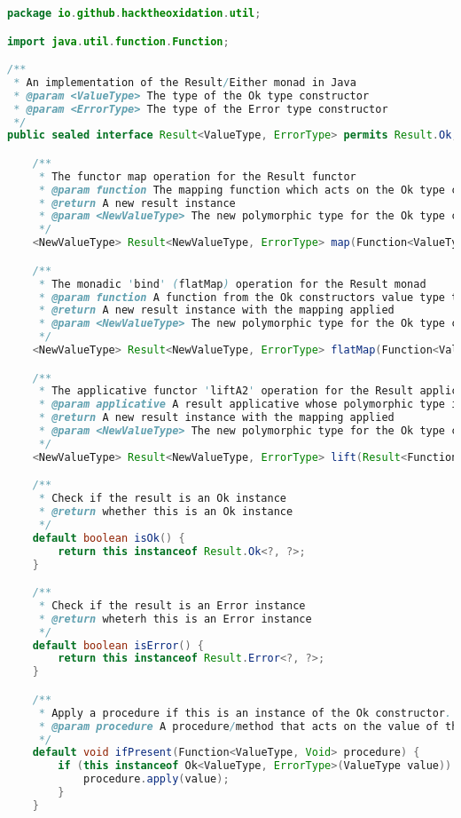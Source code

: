 \begin{lstlisting}[language=Java]
package io.github.hacktheoxidation.util;

import java.util.function.Function;

/**
 * An implementation of the Result/Either monad in Java
 * @param <ValueType> The type of the Ok type constructor
 * @param <ErrorType> The type of the Error type constructor
 */
public sealed interface Result<ValueType, ErrorType> permits Result.Ok, Result.Error {

    /**
     * The functor map operation for the Result functor
     * @param function The mapping function which acts on the Ok type constructor
     * @return A new result instance
     * @param <NewValueType> The new polymorphic type for the Ok type constructor
     */
    <NewValueType> Result<NewValueType, ErrorType> map(Function<ValueType, NewValueType> function);

    /**
     * The monadic 'bind' (flatMap) operation for the Result monad
     * @param function A function from the Ok constructors value type to a new Result
     * @return A new result instance with the mapping applied
     * @param <NewValueType> The new polymorphic type for the Ok type constructor
     */
    <NewValueType> Result<NewValueType, ErrorType> flatMap(Function<ValueType, Result<NewValueType, ErrorType>> function);

    /**
     * The applicative functor 'liftA2' operation for the Result applicative
     * @param applicative A result applicative whose polymorphic type is a mapping function
     * @return A new result instance with the mapping applied
     * @param <NewValueType> The new polymorphic type for the Ok type constructor
     */
    <NewValueType> Result<NewValueType, ErrorType> lift(Result<Function<ValueType, NewValueType>, ErrorType> applicative);

    /**
     * Check if the result is an Ok instance
     * @return whether this is an Ok instance
     */
    default boolean isOk() {
        return this instanceof Result.Ok<?, ?>;
    }

    /**
     * Check if the result is an Error instance
     * @return wheterh this is an Error instance
     */
    default boolean isError() {
        return this instanceof Result.Error<?, ?>;
    }

    /**
     * Apply a procedure if this is an instance of the Ok constructor.
     * @param procedure A procedure/method that acts on the value of the Ok constructor
     */
    default void ifPresent(Function<ValueType, Void> procedure) {
        if (this instanceof Ok<ValueType, ErrorType>(ValueType value)) {
            procedure.apply(value);
        }
    }


\end{lstlisting}
